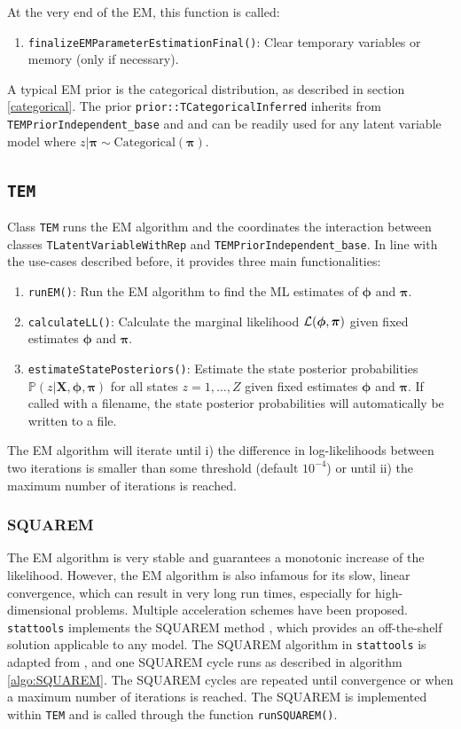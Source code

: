 \documentclass[a4paper,11pt]{article}
\def\X{\boldsymbol{X}}
\def\bpi{\boldsymbol{\pi}}
\def\bphi{\boldsymbol{\phi}}
\def\L{{\cal L}}
\def\p{\mathbb{P}}
\def\stattools{\texttt{stattools}}
\newcommand{\class}[1]{\texttt{#1}}
\newcommand{\pubfunc}[1]{\texttt{#1()}}
\begin{document}
At the very end of the EM, this function is called:
\begin{enumerate}
 \item \pubfunc{finalizeEMParameterEstimationFinal}: Clear temporary variables or memory (only if necessary).
\end{enumerate}

A typical EM prior is the categorical distribution, as described in section \ref{categorical}. The prior \class{prior::TCategoricalInferred} inherits from \class{TEMPriorIndependent\_base} and and can be readily used for any latent variable model where $z | \bpi \sim \mbox{Categorical}(\bpi)$.

\subsection{\class{TEM}}\label{section:TEM}

Class \class{TEM} runs the EM algorithm and the coordinates the interaction between classes \class{TLatentVariableWithRep} and \class{TEMPriorIndependent\_base}. In line with the use-cases described before, it provides three main functionalities:

\begin{enumerate}
 \item \pubfunc{runEM}: Run the EM algorithm to find the ML estimates of $\bphi$ and $\bpi$.
 \item \pubfunc{calculateLL}: Calculate the marginal likelihood $\L(\bphi, \bpi)$ given fixed estimates $\bphi$ and $\bpi$.
 \item \pubfunc{estimateStatePosteriors}: Estimate the state posterior probabilities $\p(z | \X, \bphi, \bpi)$ for all states $z=1, \ldots, Z$ given fixed estimates $\bphi$ and $\bpi$. If called with a filename, the state posterior probabilities will automatically be written to a file.
\end{enumerate}

The EM algorithm will iterate until i) the difference in log-likelihoods between two iterations is smaller than some threshold (default $10^{-4}$) or until ii) the maximum number of iterations is reached.

\subsubsection{SQUAREM}

The EM algorithm is very stable and guarantees a monotonic increase of the likelihood. However, the EM algorithm is also infamous for its slow, linear convergence, which can result in very long run times, especially for high-dimensional problems. Multiple acceleration schemes have been proposed. \stattools{} implements the SQUAREM method \citep{varadhan2008}, which provides an off-the-shelf solution applicable to any model. The SQUAREM algorithm in \stattools{} is adapted from \citep{varadhan2008, du2020}, and one SQUAREM cycle runs as described in algorithm \ref{algo:SQUAREM}. The SQUAREM cycles are repeated until convergence or when a maximum number of iterations is reached. The SQUAREM is implemented within \class{TEM} and is called through the function \pubfunc{runSQUAREM}.
\end{document}

